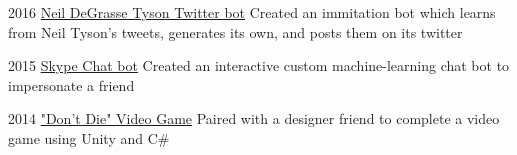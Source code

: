 \documentclass{tccv}
\begin{document}
\begin{yearlist}

\item{2016}
     {\href{https://twitter.com/neiltyson_bot}{Neil DeGrasse Tyson Twitter bot}}
     {Created an immitation bot which learns from Neil Tyson's tweets, generates its own, and posts them on its twitter}

\item{2015}
     {\href{https://github.com/apophis981/skype_bot}{Skype Chat bot}}
     {Created an interactive custom machine-learning chat bot to impersonate a friend}

\item{2014}
     {\href{https://github.com/apophis981/game_dev/tree/master/select_an_object}{"Don't Die" Video Game}}
     {Paired with a designer friend to complete a video game using Unity and C\#}
\end{yearlist}
\end{document}
